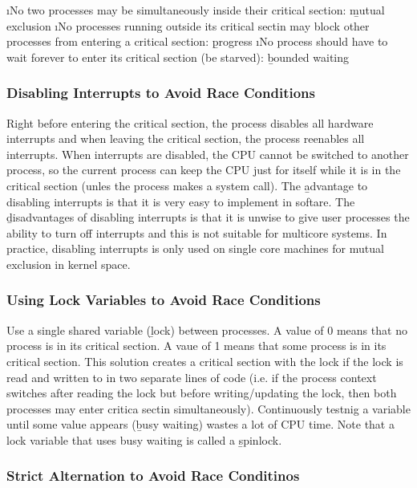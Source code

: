 \documentclass{article}
\begin{document}
    \begin{enumerate}
    \i No two processes may be simultaneously inside their critical section: \b{mutual exclusion}
    \i No processes running outside its critical sectin may block other processes from entering a critical section: \b{progress}
    \i No process should have to wait forever to enter its critical section (be starved): \b{bounded waiting}
    \end{enumerate}

    \subsubsection{Disabling Interrupts to Avoid Race Conditions}
    
    Right before entering the critical section, the process disables all hardware interrupts and when leaving the critical section, the process reenables all interrupts. When interrupts are disabled, the CPU cannot be switched to another process, so the current process can keep the CPU just for itself while it is in the critical section (unles the process makes a system call). The \b{advantage} to disabling interrupts is that it is very easy to implement in softare. The \b{disadvantages} of disabling interrupts is that it is unwise to give user processes the ability to turn off interrupts and this is not suitable for multicore systems. In practice, disabling interrupts is only used on single core machines for mutual exclusion in kernel space. 
    
    \subsubsection{Using Lock Variables to Avoid Race Conditions}

    Use a single shared variable (\b{lock}) between processes. A value of 0 means that no process is in its critical section. A vaue of 1 means that some process is in its critical section. This solution creates a critical section with the lock if the lock is read and written to in two separate lines of code (i.e. if the process context switches after reading the lock but before writing/updating the lock, then both processes may enter critica sectin simultaneously). Continuously testnig a variable until some value appears (\b{busy waiting}) wastes a lot of CPU time. Note that a lock variable that uses busy waiting is called a \b{spinlock}. 

    \subsubsection{Strict Alternation to Avoid Race Conditinos}
\end{document}
